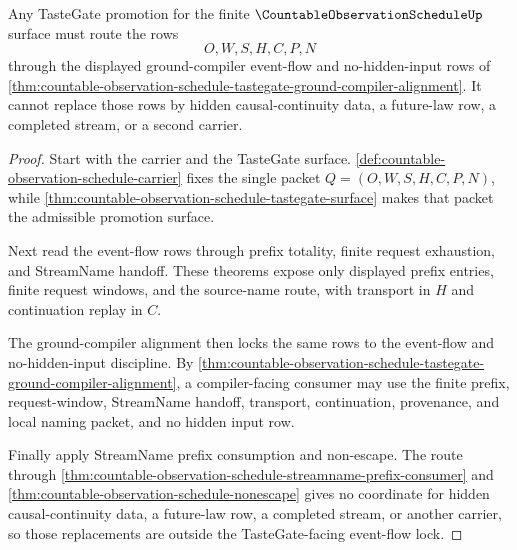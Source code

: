 \begin{theorem}
\label{thm:countable-observation-schedule-ground-compiler-event-flow-lock}
Any TasteGate promotion for the finite $\CountableObservationScheduleUp$ surface must route the rows
$$
O,W,S,H,C,P,N
$$
through the displayed ground-compiler event-flow and no-hidden-input rows of \autoref{thm:countable-observation-schedule-tastegate-ground-compiler-alignment}. It cannot replace those rows by hidden causal-continuity data, a future-law row, a completed stream, or a second carrier.
\end{theorem}
\begin{proof}
Start with the carrier and the TasteGate surface. \autoref{def:countable-observation-schedule-carrier} fixes the single packet $Q=(O,W,S,H,C,P,N)$, while \autoref{thm:countable-observation-schedule-tastegate-surface} makes that packet the admissible promotion surface.

Next read the event-flow rows through prefix totality, finite request exhaustion, and StreamName handoff. These theorems expose only displayed prefix entries, finite request windows, and the source-name route, with transport in $H$ and continuation replay in $C$.

The ground-compiler alignment then locks the same rows to the event-flow and no-hidden-input discipline. By \autoref{thm:countable-observation-schedule-tastegate-ground-compiler-alignment}, a compiler-facing consumer may use the finite prefix, request-window, StreamName handoff, transport, continuation, provenance, and local naming packet, and no hidden input row.

Finally apply StreamName prefix consumption and non-escape. The route through \autoref{thm:countable-observation-schedule-streamname-prefix-consumer} and \autoref{thm:countable-observation-schedule-nonescape} gives no coordinate for hidden causal-continuity data, a future-law row, a completed stream, or another carrier, so those replacements are outside the TasteGate-facing event-flow lock.
\end{proof}

